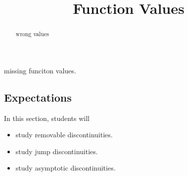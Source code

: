 \documentclass{ximera}
\title{Function Values}
\begin{document}
\begin{abstract}
wrong values
\end{abstract}
\maketitle




missing funciton values.



\subsection{Expectations}


\begin{sectionOutcomes}
In this section, students will 

\begin{itemize}
\item study removable discontinuities.
\item study jump discontinuities.
\item study asymptotic discontinuities.

\end{itemize}
\end{sectionOutcomes}
\end{document}

